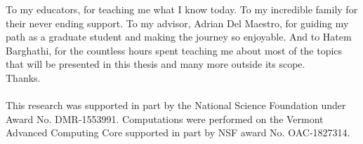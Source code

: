 To my educators, for teaching me what I know today. To my incredible family for their never ending support. To my advisor, Adrian Del Maestro, for guiding my path as a graduate student and making the journey so enjoyable. And to Hatem Barghathi, for the countless hours spent teaching me about most of the topics that will be presented in this thesis and many more outside its scope.
\\
Thanks.
\\
\\
This research was supported in part by the National Science Foundation under Award No. DMR-1553991. Computations were performed on the Vermont Advanced Computing Core supported in part by NSF award No. OAC-1827314.